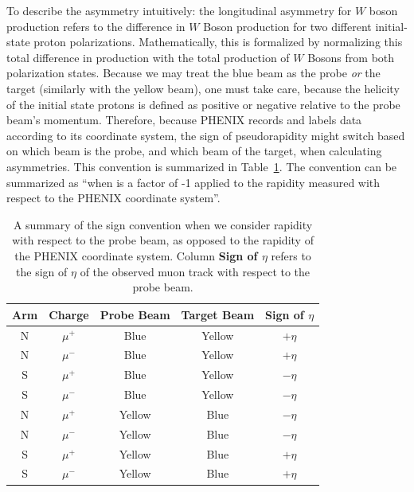 To describe the asymmetry intuitively: the longitudinal asymmetry for $W$ boson
production refers to the difference in $W$ Boson production for two different
initial-state proton polarizations.  Mathematically, this is formalized by
normalizing this total difference in production with the total production of $W$
Bosons from both polarization states. Because we may treat the blue beam as the
probe \textit{or} the target (similarly with the yellow beam), one must take
care, because the helicity of the initial state protons is defined as positive
or negative relative to the probe beam's momentum. Therefore, because PHENIX
records and labels data according to its coordinate system, the sign of
pseudorapidity might switch based on which beam is the probe, and which beam of
the target, when calculating asymmetries. This convention is summarized in
Table~\ref{tab:asymmetry_rapidity_convention}. The convention can be summarized
as ``when is a factor of -1 applied to the rapidity measured with respect to the
PHENIX coordinate system''.

\begin{table}[ht]
  \centering
  \begin{tabular}{ccccc}
    \toprule
    \textbf{Arm} & 
    \textbf{Charge} &
    \textbf{Probe Beam} & 
    \textbf{Target Beam} & 
    \textbf{Sign of $\eta$} \\
    \midrule
    N & $\mu^+$ & Blue   & Yellow & $+\eta$ \\
    N & $\mu^-$ & Blue   & Yellow & $+\eta$ \\
    S & $\mu^+$ & Blue   & Yellow & $-\eta$ \\
    S & $\mu^-$ & Blue   & Yellow & $-\eta$ \\
    N & $\mu^+$ & Yellow & Blue   & $-\eta$ \\
    N & $\mu^-$ & Yellow & Blue   & $-\eta$ \\
    S & $\mu^+$ & Yellow & Blue   & $+\eta$ \\
    S & $\mu^-$ & Yellow & Blue   & $+\eta$ \\
    \bottomrule
  \end{tabular}
  \caption{
    A summary of the sign convention when we consider rapidity with respect to
    the probe beam, as opposed to the rapidity of the PHENIX coordinate system.
    Column \textbf{Sign of $\eta$} refers to the sign of $\eta$ of the observed
    muon track with respect to the probe beam.
  }
  \label{tab:asymmetry_rapidity_convention}

\end{table}

